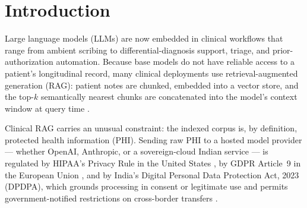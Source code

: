 \documentclass[11pt,a4paper]{article}
\begin{document}
\begin{abstract}
\textbf{Conclusions.} Asymmetric privacy transforms in clinical RAG
produce silent, clinically meaningful retrieval failures while frequently
leaving the underlying privacy goal unmet. We argue that symmetric
write-and-read tokenization should be treated as the default; read-only
schemes should be considered unsafe for clinical deployment.

\vspace{0.4em}
\noindent\textbf{Code, data, and raw results:}
\url{https://github.com/UditAkhourii/bdp-clinical-rag} (MIT licence).
The corpus generator is deterministic from \texttt{SEED=42}; every
number in this paper is regenerable byte-for-byte with one command
(\texttt{python -m corpus \&\& python -m run \&\& python -m ablate}).
Raw per-pipeline metrics: \texttt{results/results.json},
\texttt{results/ablation.json},
\texttt{results/clinical\_accuracy.json}.

\vspace{0.4em}
\noindent\textbf{Keywords:} clinical NLP; retrieval-augmented generation;
de-identification; pseudonymization; DPDPA; HIPAA; vector search;
patient-safety AI.
\end{abstract}

\section{Introduction}

Large language models (LLMs) are now embedded in clinical workflows that
range from ambient scribing to differential-diagnosis support, triage, and
prior-authorization automation. Because base models do not have reliable
access to a patient's longitudinal record, many clinical deployments use
retrieval-augmented generation (RAG): patient notes are chunked, embedded
into a vector store, and the top-$k$ semantically nearest chunks are
concatenated into the model's context window at query time
\cite{lewis2020rag,gao2024ragsurvey}.

Clinical RAG carries an unusual constraint: the indexed corpus is, by
definition, protected health information (PHI). Sending raw PHI to a hosted
model provider --- whether OpenAI, Anthropic, or a sovereign-cloud Indian
service --- is regulated by HIPAA's Privacy Rule in the United States
\cite{hhs_hipaa_privacy}, by GDPR Article~9 in the European Union
\cite{eu_gdpr_art9}, and by India's Digital Personal Data Protection Act,
2023 (DPDPA), which grounds processing in consent or legitimate use and
permits government-notified restrictions on cross-border transfers
\cite{meity_dpdpa_2023}.
\end{document}
